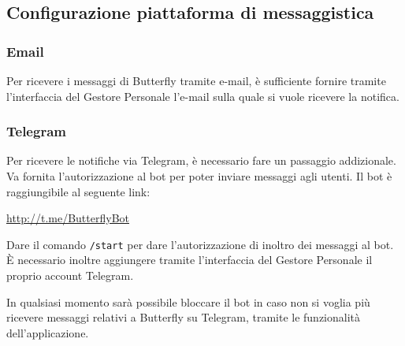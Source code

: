 \subsection{Configurazione piattaforma di messaggistica}

\subsubsection{Email}

Per ricevere i messaggi di Butterfly tramite e-mail, è sufficiente fornire tramite l'interfaccia del Gestore Personale l'e-mail sulla
quale si vuole ricevere la notifica.

\subsubsection{Telegram}

Per ricevere le notifiche via Telegram, è necessario fare un passaggio addizionale. Va fornita l'autorizzazione al bot per poter inviare messaggi
agli utenti. Il bot è raggiungibile al seguente link:
\begin{center}
    \url{http://t.me/ButterflyBot}
\end{center}

Dare il comando \texttt{/start} per dare l'autorizzazione di inoltro dei messaggi al bot.
È necessario inoltre aggiungere tramite l'interfaccia del Gestore Personale il proprio account Telegram.

In qualsiasi momento sarà possibile bloccare il bot in caso non si voglia più ricevere messaggi relativi a
Butterfly su Telegram, tramite le funzionalità dell'applicazione.
